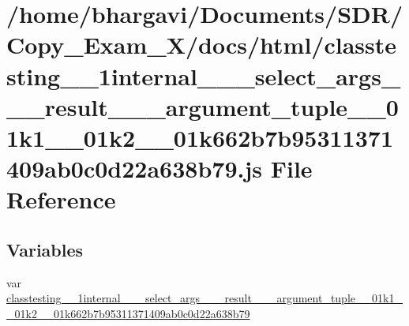 \hypertarget{classtesting__1__1internal__1__1__select__args__3__01__result__00__01__argument__tuple__00__01k18253f371f615189c66b08d15b3503ca8}{}\section{/home/bhargavi/\+Documents/\+S\+D\+R/\+Copy\+\_\+\+Exam\+\_\+X/docs/html/classtesting\+\_\+\_\+1internal\+\_\+\_\+\_\+select\+\_\+args\+\_\+\_\+\_\+result\+\_\+\_\+\_\+argument\+\_\+tuple\+\_\+\_\+01k1\+\_\+\_\+01k2\+\_\+\_\+01k662b7b95311371409ab0c0d22a638b79.js File Reference}
\label{classtesting__1__1internal__1__1__select__args__3__01__result__00__01__argument__tuple__00__01k18253f371f615189c66b08d15b3503ca8}
\subsection*{Variables}
\begin{DoxyCompactItemize}
\item 
var \hyperlink{classtesting__1__1internal__1__1__select__args__3__01__result__00__01__argument__tuple__00__01k18253f371f615189c66b08d15b3503ca8_a5d609f66231143d889561e39f3b6d5fa}{classtesting\+\_\+\_\+1internal\+\_\+\_\+\_\+select\+\_\+args\+\_\+\_\+\_\+result\+\_\+\_\+\_\+argument\+\_\+tuple\+\_\+\_\+01k1\+\_\+\_\+01k2\+\_\+\_\+01k662b7b95311371409ab0c0d22a638b79}
\end{DoxyCompactItemize}


